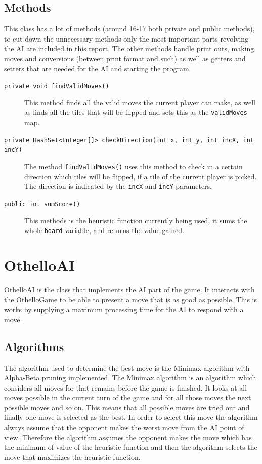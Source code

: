 \documentclass[a4paper]{article}
\begin{document}
\subsection{Methods}
This class has a lot of methods (around 16-17 both private and public methods), to cut down the unnecessary methods only the most important parts revolving the AI are included in this report. The other methods handle print outs, making moves and conversions (between print format and such) as well as getters and setters that are needed for the AI and starting the program.  
\begin{description}
\item[\texttt{private void findValidMoves()}] This method finds all the valid moves the current player can make, as well as finds all the tiles that will be flipped and sets this as the \texttt{validMoves} map.
\item[\texttt{private HashSet<Integer[]> checkDirection(int x, int y, int incX, int incY)}] The method \texttt{findValidMoves()} uses this method to check in a certain direction which tiles will be flipped, if a tile of the current player is picked. The direction is indicated by the \texttt{incX} and \texttt{incY} parameters.
\item[\texttt{public int sumScore()}] This methods is the heuristic function currently being used, it sums the whole \texttt{board} variable, and returns the value gained.
\end{description} 

\section{OthelloAI}
OthelloAI is the class that implements the AI part of the game. It interacts with the OthelloGame to be able to present a move that is as good as possible. This is works by supplying a maximum processing time for the AI to respond with a move. 

\subsection{Algorithms}
The algorithm used to determine the best move is the Minimax algorithm with Alpha-Beta pruning implemented. The Minimax algorithm is an algorithm which considers all moves for that remains before the game is finished. It looks at all moves possible in the current turn of the game and for all those moves the next possible moves and so on. This means that all possible moves are tried out and finally one move is selected as the best. In order to select this move the algorithm always assume that the opponent makes the worst move from the AI point of view. Therefore the algorithm assumes the opponent makes the move which has the minimum of value of the heuristic function and then the algorithm selects the move that maximizes the heuristic function.
\end{document}
